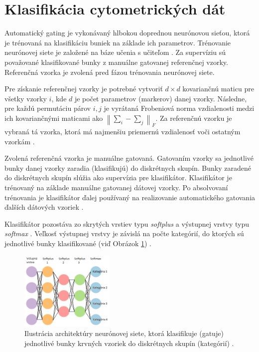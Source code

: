\section{Klasifikácia cytometrických dát}
\label{feed-forward-classifikator}

Automatický gating je vykonávaný hlbokou doprednou neurónovou sieťou, ktorá je trénovaná na klasifikáciu buniek na základe ich parametrov. Trénovanie neurónovej siete je založené na báze učenia s učiteľom \cite{Goh1995}. Za supervíziu sú považované klasifikované bunky z  manuálne gatovanej referenčnej vzorky. Referenčná vzorka je zvolená pred fázou trénovania neurónovej siete. 

Pre získanie referenčnej vzorky je potrebné vytvoriť $d \times d$ kovariančnú maticu pre všetky vzorky $i$, kde $d$ je počet parametrov (markerov) danej vzorky. Následne, pre každú permutáciu párov $i,j$ je vyrátaná Frobeniová norma \cite{formNorm} vzdialenosti medzi ich kovariančnými maticami ako $\left\lVert\sum_{i}-\sum_{j}\right\rVert_F$. Za referenčnú vzorku je vybraná tá vzorka, ktorá má najmenšiu priemernú vzdialenosť voči ostatným vzorkám \cite{Li2017}.

Zvolená referenčná vzorka je manuálne gatovaná. Gatovaním vzorky sa jednotlivé bunky danej vzorky zaradia (klasifikujú) do diskrétnych skupín. Bunky zaradené do diskrétnych skupín slúžia ako supervízia pre klasifikátor. Klasifikátor je trénovaný na základe manuálne gatovanej dátovej vzorky. Po absolvovaní trénovania je klasifikátor ďalej používaný na realizovanie automatického gatovania ďalších dátových vzoriek \cite{Li2017}.

Klasifikátor pozostáva zo skrytých vrstiev typu \textit{softplus} \cite{Goh1995} a výstupnej vrstvy typu \textit{softmax} \cite{Goh1995}. Veľkosť výstupnej vrstvy je závislá na počte kategórií, do ktorých sú jednotlivé bunky klasifikované (viď Obrázok \ref{cell_classifier_arch}) \cite{Li2017}.

\begin{figure}
\centerline{\includegraphics[width=0.4\textwidth]{images/cell_classifier_arch.png}}
\caption[Architektúra bunkového klasifikátora]{Ilustrácia architektúry neurónovej siete, ktorá klasifikuje (gatuje) jednotlivé bunky krvných vzoriek do diskrétnych skupín (kategórií) \cite{Li2017}.}
\label{cell_classifier_arch}
\end{figure}

